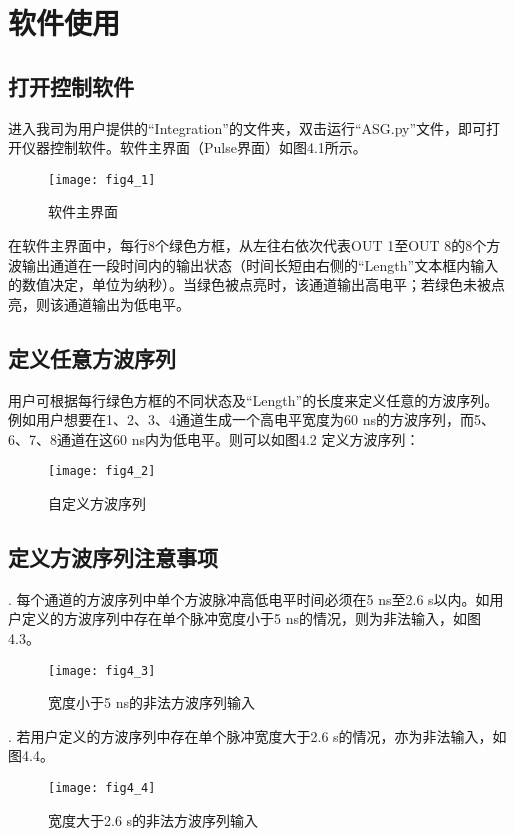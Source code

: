 \chapter{\heiti 软件使用}
\section{\heiti 打开控制软件}
进入我司为用户提供的“Integration”的文件夹，双击运行“ASG.py”文件，即可打开仪器控制软件。软件主界面（Pulse界面）如图4.1所示。
\begin{figure}[ht]
\centering
\texttt{[image: fig4\_1]}
\caption{软件主界面}
\end{figure}

在软件主界面中，每行8个绿色方框，从左往右依次代表OUT 1至OUT 8的8个方波输出通道在一段时间内的输出状态（时间长短由右侧的“Length”文本框内输入的数值决定，单位为纳秒）。当绿色被点亮时，该通道输出高电平；若绿色未被点亮，则该通道输出为低电平。

\section{\heiti 定义任意方波序列}
用户可根据每行绿色方框的不同状态及“Length”的长度来定义任意的方波序列。例如用户想要在1、2、3、4通道生成一个高电平宽度为60 ns的方波序列，而5、6、7、8通道在这60 ns内为低电平。则可以如图4.2 定义方波序列：
\begin{figure}[ht]
\centering
\texttt{[image: fig4\_2]}
\caption{自定义方波序列}
\end{figure}

\section{\heiti 定义方波序列注意事项}
. 每个通道的方波序列中单个方波脉冲高低电平时间必须在5 ns至2.6 s以内。如用户定义的方波序列中存在单个脉冲宽度小于5 ns的情况，则为非法输入，如图4.3。
\begin{figure}[H]
\centering
\texttt{[image: fig4\_3]}
\caption{宽度小于5 ns的非法方波序列输入}
\end{figure}

\newpage
{}. 若用户定义的方波序列中存在单个脉冲宽度大于2.6 s的情况，亦为非法输入，如图4.4。
\begin{figure}[ht]
\centering
\texttt{[image: fig4\_4]}
\caption{宽度大于2.6 s的非法方波序列输入}
\end{figure}

